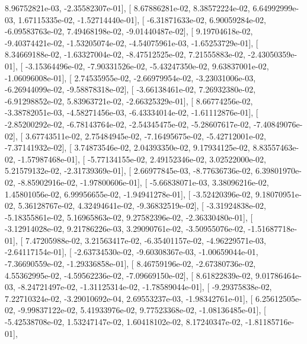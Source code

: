 \documentclass{article}
\begin{document}
          8.96752821e-03,  -2.35582307e-01],
       [  8.67886281e-02,   8.38572224e-02,   6.64992999e-03,
          1.67115335e-02,  -1.52714440e-01],
       [ -6.31871633e-02,   6.90059284e-02,  -6.09583763e-02,
          7.49468198e-02,  -9.01440487e-02],
       [  9.19704618e-02,  -9.40374421e-02,  -1.53205074e-02,
         -4.54075961e-03,  -1.65253729e-01],
       [  8.34669188e-02,  -1.63327004e-02,  -8.47512525e-02,
          7.21555883e-02,  -2.43050359e-01],
       [ -3.15364496e-02,  -7.90331526e-02,  -5.43247350e-02,
          9.63837001e-02,  -1.06096008e-01],
       [  2.74535955e-02,  -2.66979954e-02,  -3.23031006e-03,
         -6.26944099e-02,  -9.58878318e-02],
       [ -3.66138461e-02,   7.26932380e-02,  -6.91298852e-02,
          5.83963721e-02,  -2.66325329e-01],
       [  8.66774256e-02,  -3.38782051e-03,  -4.58271456e-03,
         -6.43334014e-02,  -1.61112876e-01],
       [ -2.85200292e-02,  -6.78143764e-02,  -2.54345475e-02,
         -5.28607617e-02,  -7.40849076e-02],
       [  3.67743511e-02,   2.75484945e-02,  -7.16495675e-02,
         -5.42712001e-02,  -7.37141932e-02],
       [  3.74873546e-02,   2.04393350e-02,   9.17934125e-02,
          8.83557463e-02,  -1.57987468e-01],
       [ -5.77134155e-02,   2.49152346e-02,   3.02522000e-02,
          5.21579132e-02,  -2.31739369e-01],
       [  2.66977845e-03,  -8.77636736e-02,   6.39801970e-02,
         -8.85902916e-02,  -1.97800606e-01],
       [ -5.66838071e-03,   3.38096216e-02,   1.45801056e-02,
          6.99956655e-02,  -1.94941278e-01],
       [ -3.52420396e-02,   9.18070951e-02,   5.36128767e-02,
          4.32494641e-02,  -9.36832519e-02],
       [ -3.31924838e-02,  -5.18355861e-02,   5.16965863e-02,
          9.27582396e-02,  -2.36330480e-01],
       [ -3.12914028e-02,   9.21786226e-03,   3.29090761e-02,
         -3.50955076e-02,  -1.51687718e-01],
       [  7.47205988e-02,   3.21563417e-02,  -6.35401157e-02,
         -4.96229571e-03,  -2.64117154e-01],
       [ -2.63734530e-02,  -9.60308367e-03,  -1.00659044e-01,
         -7.36690559e-02,  -1.29336858e-01],
       [  8.46759196e-02,  -2.67380736e-02,   4.55362995e-02,
         -4.59562236e-02,  -7.09669150e-02],
       [  8.61822839e-02,   9.01786464e-03,  -8.24721497e-02,
         -1.31125314e-02,  -1.78589044e-01],
       [ -9.29375838e-02,   7.22710324e-02,  -3.29010692e-04,
          2.69553237e-03,  -1.98342761e-01],
       [  6.25612505e-02,  -9.99837122e-02,   5.41933976e-02,
          9.77523368e-02,  -1.08136485e-01],
       [ -5.42538708e-02,   1.53247147e-02,   1.60418102e-02,
          8.17240347e-02,  -1.81185716e-01],
\end{document}
